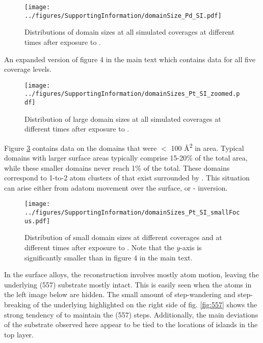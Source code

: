 \documentclass[journal = jpccck, manuscript = suppinfo]{achemso}
\begin{document}
\begin{figure}
\texttt{[image: ../figures/SupportingInformation/domainSize\_Pd\_SI.pdf]}
\caption{Distributions of  domain sizes at all simulated
 coverages at different times after exposure to .}
\label{fig:Pd_SI}
\end{figure}

\newpage

An expanded version of figure 4 in the main text which contains data
for all five  coverage levels.

\begin{figure}
  \texttt{[image: ../figures/SupportingInformation/domainSizes\_Pt\_SI\_zoomed.pdf]}
  \caption{Distribution of large  domain sizes at all simulated
     coverages at different times after exposure to .}
\label{fig:Pt_SI_big}
\end{figure}

\newpage

Figure \ref{fig:Pt_SI_small} contains data on the  domains that
were $<$ 100 \AA\textsuperscript{2} in area.  Typical domains with
larger surface areas typically comprise 15-20\% of the total area,
while these smaller domains never reach 1\% of the total. These
domains correspond to 1-to-2 atom clusters of  that exist
surrounded by . This situation can arise either from 
adatom movement over the  surface, or -
inversion.

\begin{figure}
  \texttt{[image: ../figures/SupportingInformation/domainSizes\_Pt\_SI\_smallFocus.pdf]}
  \caption{Distribution of small  domain sizes at different
     coverages and at different times after exposure to
    . Note that the $y$-axis is significantly smaller than in
    figure 4 in the main text.}
\label{fig:Pt_SI_small}
\end{figure}


\newpage

In the surface alloys, the reconstruction involves mostly  atom
motion, leaving the underlying (557) substrate mostly intact.
This is easily seen when the  atoms in the left image below are
hidden.  The small amount of step-wandering and step-breaking of the
underlying  highlighted on the right side of fig. \ref{fig:557}
shows the strong tendency of  to maintain the (557) steps.
Additionally, the main deviations of the  substrate observed
here appear to be tied to the locations of islands in the  top
layer.
\end{document}
